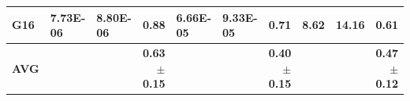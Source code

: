 \documentclass[encoding=utf8,british]{tumphthesis}
\begin{document}
\begin{table}[H]
\begin{subtable}{1\textwidth}
{\begin{tabular}{|l|llr|llr|llr|}
\rowcolor[HTML]{CFE2F3} 
\textbf{G16}                              & 7.73E-06                                             & 8.80E-06                                              & \textbf{0.88}                                    & 6.66E-05                                             & 9.33E-05                                              & \textbf{0.71}                                    & 8.62                                                 & 14.16                                                 & \textbf{0.61}                                    \\ \hline
\textbf{AVG}                             &                                                      &                                                       & \textbf{0.63$\pm$0.15}                           &                                                      &                                                       & \textbf{0.40$\pm$0.15}                           &                                                      &                                                       & \textbf{0.47$\pm$0.12}                          \\ \hline
\end{tabular}}
\end{subtable}

\bigskip
\begin{subtable}{1\textwidth}
\label{tab:benchmark-radmon-cpCSSO}


\end{subtable}
\end{table}
\end{document}
